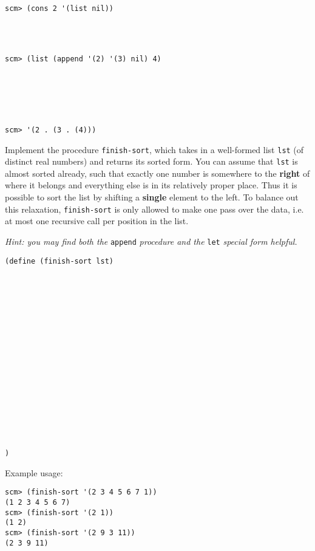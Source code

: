 \documentclass[twoside]{article}
\begin{document}
\begin{enumerate}
\newpage

\begin{lstlisting}
scm> (cons 2 '(list nil))




scm> (list (append '(2) '(3) nil) 4)






scm> '(2 . (3 . (4)))
\end{lstlisting}

\vspace{0.6in}


Implement the procedure \texttt{finish-sort}, which takes in a well-formed list \texttt{lst} (of distinct real numbers) and returns its sorted form. You can assume that \texttt{lst} is almost sorted already, such that exactly one number is somewhere to the \textbf{right} of where it belongs and everything else is in its relatively proper place. Thus it is possible to sort the list by shifting a \textbf{single} element to the left. To balance out this relaxation, \texttt{finish-sort} is only allowed to make one pass over the data, i.e. at most one recursive call per position in the list.

\textit{Hint: you may find both the} \texttt{append} \textit{procedure and the} \texttt{let} \textit{special form helpful.}

\begin{lstlisting}
(define (finish-sort lst)


















)
\end{lstlisting}

Example usage:

\begin{lstlisting}
scm> (finish-sort '(2 3 4 5 6 7 1))
(1 2 3 4 5 6 7)
scm> (finish-sort '(2 1))
(1 2)
scm> (finish-sort '(2 9 3 11))
(2 3 9 11)
\end{lstlisting}

\end{enumerate}
\end{document}
